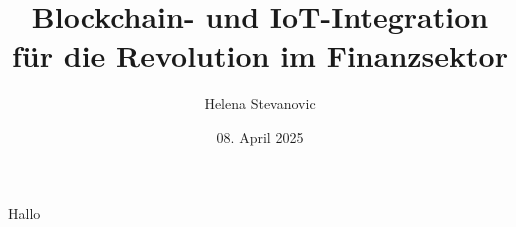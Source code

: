 \documentclass[
    paper = A4,		%
    11pt, 			%
    DIV=12, 		%
    parskip=half,	%
]{article}
\title{Blockchain- und IoT-Integration für die Revolution im Finanzsektor}
\author{Helena Stevanovic}
\date{08. April 2025}
\begin{document}
\maketitle
\tableofcontents





Hallo \cite[p.~270]{chowdhary2025smart}


\printbibliography
\end{document}
